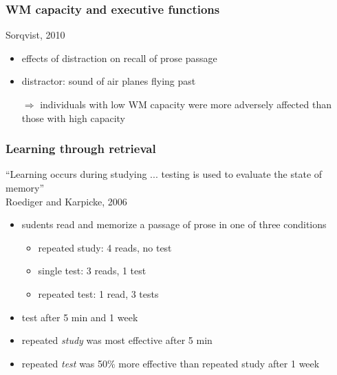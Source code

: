 \documentclass[]{beamer}
\begin{document}
\begin{frame}
 \frametitle{WM capacity and executive functions}
\begin{overlayarea}{110mm}{80mm}
 Sorqvist, 2010
\begin{itemize}
 \item effects of distraction on recall of prose passage
 \item distractor: sound of air planes flying past
 \item[$\Rightarrow$] individuals with low WM capacity were more adversely affected than those with high capacity 
\end{itemize}


\end{overlayarea}
\end{frame}



\begin{frame}
 \frametitle{Learning through retrieval}
\begin{overlayarea}{110mm}{70mm}
``Learning occurs during studying ... testing is used to evaluate the state of memory''\\
\vspace{2mm}
Roediger and Karpicke, 2006
\begin{itemize}
 \item sudents read and memorize a passage of prose in one of three conditions
 \begin{itemize}
  \item repeated study: 4 reads, no test
  \item single test: 3 reads, 1 test
  \item repeated test: 1 read, 3 tests
 \end{itemize}
 \item test after 5 min and 1 week
\item[]
 \item<2->[$\rightarrow$] repeated \textit{study} was most effective after 5 min
 \item<3->[$\rightarrow$] repeated \textit{test} was 50\% more effective than repeated study after 1 week
\end{itemize}
\end{overlayarea}
\end{frame}
\end{document}
